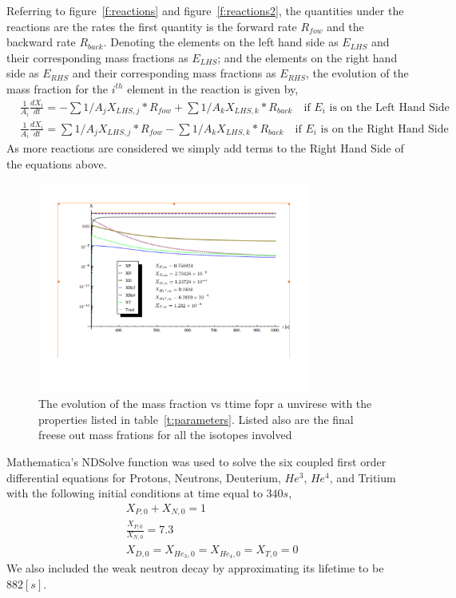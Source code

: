 \documentclass[twoside]{article}
\begin{document}
Referring to  figure~\ref{f:reactions} and figure~\ref{f:reactions2}, the quantities under the reactions are the rates the first quantity is the forward rate $R_{fow}$ and the backward rate $R_{back}$. Denoting the elements on the left hand side as $E_{LHS}$  and their corresponding mass fractions as $E_{LHS}$; and the elements on the right hand side as $E_{RHS}$ and their corresponding mass fractions as $E_{RHS}$, the evolution of the mass fraction for the $i^{th}$ element in the reaction is given by,
\begin{align}
&\frac{1}{A_{i}}\frac{dX_{i}}{dt} = -\sum 1/A_{j}X_{LHS,j}*R_{fow}+ \sum 1/A_{k}X_{LHS,k}*R_{back}\quad\text{if $E_{i}$ is on the Left Hand Side}\\
&\frac{1}{A_{i}}\frac{dX_{i}}{dt} = \sum 1/A_{j}X_{LHS,j}*R_{fow}-\sum 1/A_{k}X_{LHS,k}*R_{back}\quad\text{if $E_{i}$ is on the Right Hand Side}
\end{align} 
As more reactions are considered we simply add terms to the Right Hand Side of the equations above.

\begin{figure}[b!]
  \centering
	\includegraphics[width=0.8\textwidth]{fracvst.pdf}
  \caption{The evolution of the mass fraction vs ttime fopr a unvirese with the properties listed in table~\ref{t:parameters}. Listed also are the final freese out mass frations for all the isotopes involved  }\label{f:fracvst}
\end{figure}

Mathematica's NDSolve function was used to solve the six coupled first order differential equations for Protons, Neutrons, Deuterium, $He^{3}$, $He^{4}$, and Tritium with the following initial conditions at time equal to $340s$,
\begin{align}
&X_{P,0}+X_{N,0} = 1\\
&\frac{X_{P,0}}{X_{N,0}} = 7.3\\
&X_{D,0} = X_{He_{3},0} = X_{He_{4},0}=X_{T,0} = 0   
\end{align}
We also included the weak neutron decay by approximating its lifetime to be $882 [s]$.\par 
\end{document}
